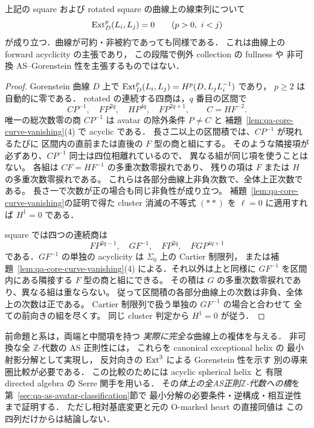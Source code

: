 \begin{proposition}
\label{prop:qa-core-forward-ext-vanishing}
上記の square および rotated square の曲線上の線束列について
\[
 \Ext_D^p(L_i,L_j)=0\qquad(p>0,\ i<j)
\]
が成り立つ．曲線が可約・非被約であっても同様である．
これは曲線上の forward acyclicity の主張であり，
この段階で例外 collection の fullness や
非可換 AS--Gorenstein 性を主張するものではない．
\end{proposition}
\begin{proof}
Gorenstein 曲線 $D$ 上で
$\operatorname{Ext}^p_D(L_i,L_j)=H^p(D,L_jL_i^{-1})$ であり，
$p\ge2$ は自動的に零である．
rotated の連続する四商は，$q$ 番目の区間で
\[
 C P^{-1},\quad FP^{2q},\quad HP^{4q},
       \quad FP^{2q+1},
 \qquad C=HF^{-2}.
\]
唯一の総次数零の商 $CP^{-1}$ は
avatar の除外条件 $P\ne C$ と
補題~\ref{lem:qa-core-curve-vanishing}(4) で acyclic である．
長さ二以上の区間積では、$CP^{-1}$ が現れるたびに
区間内の直前または直後の $F$ 型の商と組にする。
そのような隣接項が必ずあり、$CP^{-1}$ 同士は四位相離れているので、
異なる組が同じ項を使うことはない。
各組は $CF=HF^{-1}$ の多重次数零捩れであり、
残りの項は $F$ または $H$ の多重次数零捩れである。
これらは各部分曲線上非負次数で、全体上正次数である。
長さ一で次数が正の場合も同じ非負性が成り立つ。
補題~\ref{lem:qa-core-curve-vanishing}の証明で得た
cluster 消滅の不等式 $(**)$ を $\ell=0$ に適用すれば
$H^1=0$ である．

square では四つの連続商は
\[
 FP^{2q-1},\quad GF^{-1},\quad FP^{2q},
       \quad FGP^{4q+1}
\]
である．$GF^{-1}$ の単独の acyclicity は
$\Sigma_0$ 上の Cartier 制限列，
または補題~\ref{lem:qa-core-curve-vanishing}(4)
による．それ以外は上と同様に
$GF^{-1}$ を区間内にある隣接する $F$ 型の商と組にできる。
その積は $G$ の多重次数零捩れであり、異なる組は重ならない。
従って区間積の各部分曲線上の次数は非負、全体上の次数は正である。
Cartier 制限列で扱う単独の $GF^{-1}$ の場合と合わせて
全ての前向きの組を尽くす。
同じ cluster 判定から $H^1=0$ が従う．
\end{proof}

\begin{remark}[AS 正則性への論理的な境界]
\label{rem:qa-core-helix-not-as}
前命題と系は，両端と中間項を持つ
\emph{実際に完全な}曲線上の複体を与える．
非可換な全 $\mathbb Z$-代数の AS 正則性には，
これらを canonical exceptional helix の
最小射影分解として実現し，
反対向きの $\operatorname{Ext}^3$ による Gorenstein 性を示す
別の導来圏比較が必要である．
この比較のためには acyclic spherical helix と
有限 directed algebra の Serre 関手を用いる．
その\emph{体上の全AS正則$\mathbb Z$-代数への橋}を
第~\ref{sec:qa-as-avatar-classification}節で
最小分解の必要条件・逆構成・相互逆性まで証明する．
ただし相対基底変更と元の O-marked heart の直接同値は
この四列だけからは結論しない．
\end{remark}
